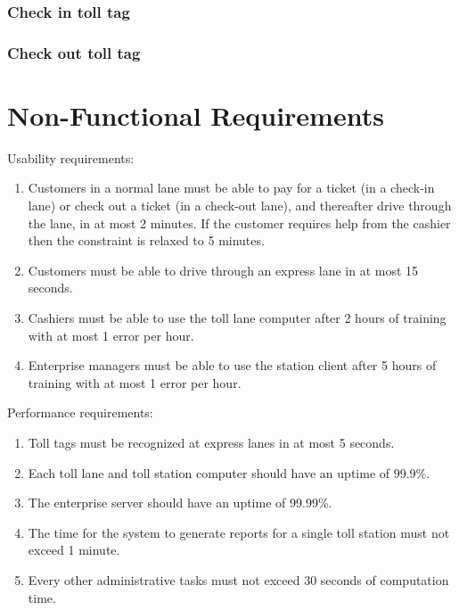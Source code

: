 \subsubsection{Check in toll tag} \label{sec:use_case_check_in_toll_tag}

\subsubsection{Check out toll tag} \label{sec:use_case_check_out_toll_tag}





\section{Non-Functional Requirements}
Usability requirements:
\begin{enumerate}
\item Customers in a normal lane must be able to pay for a ticket (in a check-in lane) or check out a ticket (in a check-out lane), and thereafter drive through the lane, in at most 2 minutes. If the customer requires help from the cashier then the constraint is relaxed to 5 minutes.
\item Customers must be able to drive through an express lane in at most 15 seconds.
\item Cashiers must be able to use the toll lane computer after 2 hours of training with at most 1 error per hour.
\item Enterprise managers must be able to use the station client after 5 hours of training with at most 1 error per hour.
\end{enumerate}


Performance requirements:
\begin{enumerate}
\item Toll tags must be recognized at express lanes in at most 5 seconds.
\item Each toll lane and toll station computer should have an uptime of 99.9\%.
\item The enterprise server should have an uptime of 99.99\%.
\item The time for the system to generate reports for a single toll station must not exceed 1 minute.
\item Every other administrative tasks must not exceed 30 seconds of computation time.
\end{enumerate}